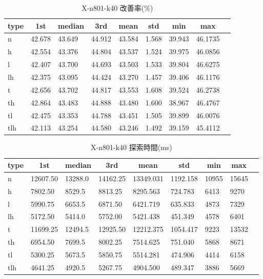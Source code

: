 \begin{table}[htbp]
    \caption{X-n801-k40 改善率(\%)}
    \begin{tabular}{|l|l|l|l|l|l|l|l|l|}\hline
    \multicolumn{1}{|c|}{\textbf{type}}
    &\multicolumn{1}{|c|}{\textbf{1st}}
    &\multicolumn{1}{c|}{\textbf{median}}
    &\multicolumn{1}{c|}{\textbf{3rd}}
    &\multicolumn{1}{c|}{\textbf{mean}}
    &\multicolumn{1}{c|}{\textbf{std}}
    &\multicolumn{1}{c|}{\textbf{min}}
    &\multicolumn{1}{c|}{\textbf{max}}\\\hline
	n & 42.678 & 43.649 & 44.912 & 43.584 & 1.568 & 39.943 & 46.1735\\\hline
	h & 42.554 & 43.376 & 44.804 & 43.537 & 1.524 & 39.975 & 46.0856\\\hline
	l & 42.407 & 43.700 & 44.693 & 43.503 & 1.533 & 39.804 & 46.6275\\\hline
	lh & 42.375 & 43.095 & 44.424 & 43.270 & 1.457 & 39.406 & 46.1176\\\hline
	t & 42.656 & 43.702 & 44.817 & 43.553 & 1.608 & 39.524 & 46.2738\\\hline
	th & 42.864 & 43.483 & 44.888 & 43.480 & 1.600 & 38.967 & 46.4767\\\hline
	tl & 42.475 & 43.353 & 44.788 & 43.451 & 1.505 & 39.899 & 46.0076\\\hline
	tlh & 42.113 & 43.254 & 44.580 & 43.246 & 1.492 & 39.159 & 45.4112\\\hline
	\end{tabular}
\end{table}
\begin{table}[htbp]
    \caption{X-n801-k40 探索時間(ms)}
    \begin{tabular}{|l|l|l|l|l|l|l|l|l|}\hline
    \multicolumn{1}{|c|}{\textbf{type}}
    &\multicolumn{1}{|c|}{\textbf{1st}}
    &\multicolumn{1}{c|}{\textbf{median}}
    &\multicolumn{1}{c|}{\textbf{3rd}}
    &\multicolumn{1}{c|}{\textbf{mean}}
    &\multicolumn{1}{c|}{\textbf{std}}
    &\multicolumn{1}{c|}{\textbf{min}}
    &\multicolumn{1}{c|}{\textbf{max}}\\\hline
	n & 12607.50 & 13288.0 & 14162.25 & 13349.031 & 1192.158 & 10955 & 15645\\\hline
	h & 7802.50 & 8529.5 & 8813.25 & 8295.563 & 724.783 & 6413 & 9270\\\hline
	l & 5990.75 & 6653.5 & 6871.50 & 6421.719 & 635.833 & 4873 & 7329\\\hline
	lh & 5172.50 & 5414.0 & 5752.00 & 5421.438 & 451.349 & 4578 & 6401\\\hline
	t & 11699.25 & 12494.5 & 12925.50 & 12212.375 & 1054.417 & 9223 & 13532\\\hline
	th & 6954.50 & 7699.5 & 8002.25 & 7514.625 & 751.040 & 5868 & 8671\\\hline
	tl & 5300.25 & 5673.5 & 5850.75 & 5514.281 & 474.906 & 4414 & 6158\\\hline
	tlh & 4641.25 & 4920.5 & 5267.75 & 4904.500 & 489.347 & 3886 & 5669\\\hline
	\end{tabular}
\end{table}
